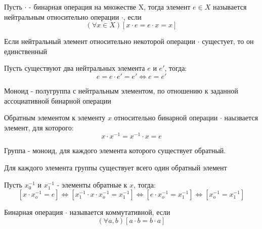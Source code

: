 \begin{Def}
	Пусть $\cdot$ - бинарная операция на множестве X, тогда элемент $e \in X$ называется нейтральным относительно операции $\cdot$, если
	\[
		\left(\forall x \in X \right) \left[x \cdot e = e \cdot x = x \right] 
	\]
\end{Def}

\begin{Th}
	Если нейтральный элемент относительно некоторой операции $\cdot$ сущестует, то он единственный
\end{Th}

\begin{Proof}
	Пусть существуют два нейтральных элемента $e$ и $e'$, тогда:
	\[ e = e \cdot e' = e' \Leftrightarrow e = e' \]
\end{Proof}

\begin{Def}
	Моноид - полугруппа с нейтральным элементом, по отношению к заданной ассоциативной бинарной операции
\end{Def}

\begin{Def}
	Обратным элементом к элементу $x$ относительно бинарной операции $\cdot$ наызвается элемент, для которого:
	\[
		x \cdot x^{-1} = x^{-1} \cdot x = e
	\]
\end{Def}

\begin{Def}
	Группа - моноид, для каждого элемента которого существует обратный.
\end{Def}

\begin{Th}
	Для каждого элемента группы существует всего один обратный элемент
\end{Th}

\begin{Proof}
	Пусть $x_0^{-1}$ и $x_1^{-1}$ - элементы обратные к $x$, тогда:
	\[
		\left[x \cdot x_o^{-1} = e\right] \Leftrightarrow \left[x_1^{-1} \cdot x \cdot x_o^{-1} = x_1^{-1}\right] \Leftrightarrow \left[e \cdot x_o^{-1} = x_1^{-1}\right] \Leftrightarrow \left[x_o^{-1} = x_1^{-1}\right]
	\]
\end{Proof}

\begin{Def}
	Бинарная операция $\cdot$ называется коммутативной, если
	\[
		\left(\forall a, b\right)\left[a \cdot b = b \cdot a\right]
	\]
\end{Def}

